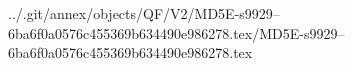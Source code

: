 ../.git/annex/objects/QF/V2/MD5E-s9929--6ba6f0a0576c455369b634490e986278.tex/MD5E-s9929--6ba6f0a0576c455369b634490e986278.tex